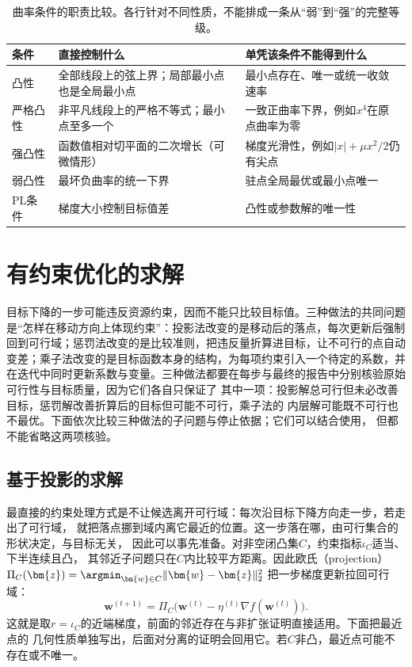 \begin{table}[htbp]
 \centering\small
 \begin{tabularx}{\linewidth}{@{}lXX@{}}
 \toprule
 条件 & 直接控制什么 & 单凭该条件不能得到什么\\
 \midrule
 凸性 & 全部线段上的弦上界；局部最小点也是全局最小点 & 最小点存在、唯一或统一收敛速率\\
 严格凸性 & 非平凡线段上的严格不等式；最小点至多一个 & 一致正曲率下界，例如$x^4$在原点曲率为零\\
 强凸性 & 函数值相对切平面的二次增长（可微情形） & 梯度光滑性，例如$|x|+\mu x^2/2$仍有尖点\\
 弱凸性 & 最坏负曲率的统一下界 & 驻点全局最优或最小点唯一\\
 PL条件 & 梯度大小控制目标值差 & 凸性或参数解的唯一性\\
 \bottomrule
 \end{tabularx}
 \caption{曲率条件的职责比较。各行针对不同性质，不能排成一条从“弱”到“强”的完整等级。}
 \label{tab:opt-curvature-conditions}
\end{table}

\section{有约束优化的求解}
\label{sec:opt-constraints-duality-certificates}

目标下降的一步可能违反资源约束，因而不能只比较目标值。三种做法的共同问题是“怎样在移动方向上体现约束”：投影法改变的是移动后的落点，每次更新后强制回到可行域；惩罚法改变的是比较准则，把违反量折算进目标，让不可行的点自动变差；乘子法改变的是目标函数本身的结构，为每项约束引入一个待定的系数，并在迭代中同时更新系数与变量。三种做法都要在每步与最终的报告中分别核验原始可行性与目标质量，因为它们各自只保证了
其中一项：投影解总可行但未必改善目标，惩罚解改善折算后的目标但可能不可行，乘子法的
内层解可能既不可行也不最优。下面依次比较三种做法的子问题与停止依据；它们可以结合使用，
但都不能省略这两项核验。

\subsection{基于投影的求解}
\label{sec:opt-projected-methods}

最直接的约束处理方式是不让候选离开可行域：每次沿目标下降方向走一步，若走出了可行域，
就把落点挪到域内离它最近的位置。这一步落在哪，由可行集合的形状决定，与目标无关，
因此可以事先准备。对非空闭凸集$C$，约束指标$\iota_C$适当、下半连续且凸，
其邻近子问题只在$C$内比较平方距离。因此欧氏（projection）
$\Pi_C(\bm{z})=\argmin_{\bm{w}\in C}\lVert\bm{w}-\bm{z}\rVert_2^2$
把一步梯度更新拉回可行域：
\[
  \bm{w}^{(t+1)}
  =\Pi_C\bigl(\bm{w}^{(t)}-\eta^{(t)}\nabla f(\bm{w}^{(t)})\bigr).
\]
这就是取$r=\iota_C$的近端梯度，前面的邻近存在与非扩张证明直接适用。下面把最近点的
几何性质单独写出，后面对分离的证明会回用它。若$C$非凸，最近点可能不存在或不唯一。

